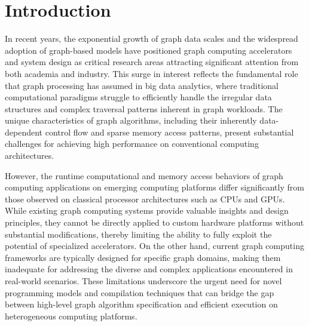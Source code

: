\section{Introduction}
In recent years, the exponential growth of graph data scales and the widespread adoption of graph-based models have positioned graph computing accelerators 
and system design as critical research areas attracting significant attention from both academia and industry. 
This surge in interest reflects the fundamental role that graph processing has assumed in big data analytics, 
where traditional computational paradigms struggle to efficiently handle the irregular data structures and complex traversal patterns inherent in graph workloads. 
The unique characteristics of graph algorithms, including their inherently data-dependent control flow and sparse memory access patterns, 
present substantial challenges for achieving high performance on conventional computing architectures.

However, the runtime computational and memory access behaviors of graph computing applications on emerging computing platforms differ 
significantly from those observed on classical processor architectures such as CPUs and GPUs. 
While existing graph computing systems provide valuable insights and design principles, 
they cannot be directly applied to custom hardware platforms without substantial modifications, 
thereby limiting the ability to fully exploit the potential of specialized accelerators. 
On the other hand, current graph computing frameworks are typically designed for specific graph domains, 
making them inadequate for addressing the diverse and complex applications encountered in real-world scenarios. 
These limitations underscore the urgent need for novel programming models and compilation techniques 
that can bridge the gap between high-level graph algorithm specification and efficient execution on heterogeneous computing platforms.